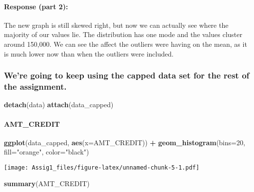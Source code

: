 \documentclass[
]{article}
\newenvironment{Shaded}{\begin{snugshade}}{\end{snugshade}}
\newcommand{\AttributeTok}[1]{\textcolor[rgb]{0.13,0.29,0.53}{#1}}
\newcommand{\DecValTok}[1]{\textcolor[rgb]{0.00,0.00,0.81}{#1}}
\newcommand{\FunctionTok}[1]{\textcolor[rgb]{0.13,0.29,0.53}{\textbf{#1}}}
\newcommand{\NormalTok}[1]{#1}
\newcommand{\SpecialCharTok}[1]{\textcolor[rgb]{0.81,0.36,0.00}{\textbf{#1}}}
\newcommand{\StringTok}[1]{\textcolor[rgb]{0.31,0.60,0.02}{#1}}
\begin{document}
\hypertarget{response-part-2}{%
\paragraph{Response (part 2):}\label{response-part-2}}

The new graph is still skewed right, but now we can actually see where
the majority of our values lie. The distribution has one mode and the
values cluster around 150,000. We can see the affect the outliers were
having on the mean, as it is much lower now than when the outliers were
included.

\hypertarget{were-going-to-keep-using-the-capped-data-set-for-the-rest-of-the-assignment.}{%
\subsubsection{We're going to keep using the capped data set for the
rest of the
assignment.}\label{were-going-to-keep-using-the-capped-data-set-for-the-rest-of-the-assignment.}}

\begin{Shaded}
\begin{Highlighting}[]
\FunctionTok{detach}\NormalTok{(data)}
\FunctionTok{attach}\NormalTok{(data\_capped)}
\end{Highlighting}
\end{Shaded}

\hypertarget{amt_credit}{%
\paragraph{AMT\_CREDIT}\label{amt_credit}}

\begin{Shaded}
\begin{Highlighting}[]
\FunctionTok{ggplot}\NormalTok{(data\_capped, }\FunctionTok{aes}\NormalTok{(}\AttributeTok{x=}\NormalTok{AMT\_CREDIT)) }\SpecialCharTok{+}
  \FunctionTok{geom\_histogram}\NormalTok{(}\AttributeTok{bins=}\DecValTok{20}\NormalTok{, }\AttributeTok{fill=}\StringTok{"orange"}\NormalTok{, }\AttributeTok{color=}\StringTok{"black"}\NormalTok{)}
\end{Highlighting}
\end{Shaded}

\texttt{[image: Assig1\_files/figure-latex/unnamed-chunk-5-1.pdf]}

\begin{Shaded}
\begin{Highlighting}[]
\FunctionTok{summary}\NormalTok{(AMT\_CREDIT)}
\end{Highlighting}
\end{Shaded}
\end{document}

